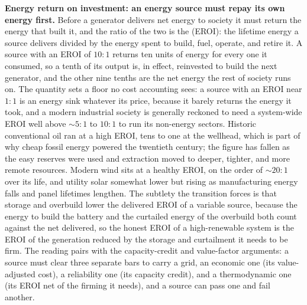 \begin{mastery}
\textbf{Energy return on investment: an energy source must repay its own
energy first.} Before a generator delivers net energy to society it must
return the energy that built it, and the ratio of the two is the
 (EROI): the lifetime energy a
source delivers divided by the energy spent to build, fuel, operate, and
retire it. A source with an EROI of $10{:}1$ returns ten units of energy for
every one it consumed, so a tenth of its output is, in effect, reinvested to
build the next generator, and the other nine tenths are the net energy the
rest of society runs on. The quantity sets a floor no cost accounting sees: a
source with an EROI near $1{:}1$ is an energy sink whatever its price, because
it barely returns the energy it took, and a modern industrial society is
generally reckoned to need a system-wide EROI well above $\sim 5{:}1$ to
$10{:}1$ to run its non-energy sectors. Historic conventional oil ran at a
high EROI, tens to one at the wellhead, which is part of why cheap fossil
energy powered the twentieth century; the figure has fallen as the easy
reserves were used and extraction moved to deeper, tighter, and more remote
resources. Modern wind sits at a healthy EROI, on the order of $\sim 20{:}1$
over its life, and utility solar somewhat lower but rising as manufacturing
energy falls and panel lifetimes lengthen. The subtlety the transition forces
is that storage and overbuild lower the delivered EROI of a variable source,
because the energy to build the battery and the curtailed energy of the
overbuild both count against the net delivered, so the honest EROI of a
high-renewable system is the EROI of the generation reduced by the storage and
curtailment it needs to be firm. The reading pairs with the capacity-credit
and value-factor arguments: a source must clear three separate bars to carry a
grid, an economic one (its value-adjusted cost), a reliability one (its
capacity credit), and a thermodynamic one (its EROI net of the firming it
needs), and a source can pass one and fail another.
\end{mastery}

